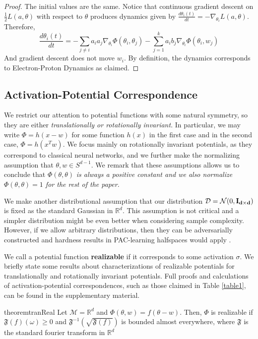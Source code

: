 \documentclass{article}
\newcommand{\R}{{\mathbb{R}}}
\begin{document}
\begin{proof}
The initial values are the same. Notice that continuous gradient descent on $\frac{1}{2}L(a,\theta)$ with respect to $\theta$ produces dynamics given by $\frac{d\theta_i(t)}{dt} = -\nabla_{\theta_i}L(a,\theta)$. Therefore,
\[\frac{d\theta_i(t)}{dt} = -\sum_{j \neq i} a_i a_j \nabla_{\theta_i}\Phi(\theta_i,\theta_j) - \sum_{j=1}^k a_ib_j\nabla_{\theta_i} \Phi(\theta_i,w_j)\]
And gradient descent does not move $w_i$. By definition, the dynamics corresponds to Electron-Proton Dynamics as claimed.
\end{proof}

\subsection{Activation-Potential Correspondence}


We restrict our attention to potential functions with some natural symmetry, so they are either {\it translationally or rotationally invariant}. In particular, we may write $\Phi= h(x-w)$ for some function $h(x)$  in the first case and in the second case, $\Phi = h(x^Tw)$. We focus mainly on rotationally invariant potentials, as they correspond to classical neural networks, and we further make the normalizing assumption that $\theta, w \in S^{d-1}$. We remark that these assumptions allows us to conclude that $\Phi(\theta,\theta)$ {\it is always a positive constant and we also normalize $\Phi(\theta,\theta) = 1$ for the rest of the paper.}

We make another distributional assumption that our distribution $\mathcal{D} = \mathcal{N}(0, {\bf I_{d\times d}})$ is fixed as the standard Gaussian in $\R^d$. This assumption is not critical and a simpler distribution might be even better when considering sample complexity. However, if we allow arbitrary distributions, then they can be adversarially constructed and hardness results in PAC-learning halfspaces would apply \cite{klivans2006cryptographic}. 

We call a potential function {\bf realizable} if it corresponds to some activation $\sigma$.  We briefly state some results about characterizations of realizable potentials for translationally and rotationally invariant potentials. Full proofs and calculations of activation-potential correspondences, such as those claimed in Table \ref{table1}, can be found in the supplementary material. 
\begin{restatable}{theorem}{tranReal}
\label{thm:tranReal}
Let $\mathcal{M} = \R^d$ and $\Phi(\theta,w) = f(\theta - w)$. Then, $\Phi$ is realizable if $\mathfrak{F}(f)(\omega) \geq 0$ and $\mathfrak{F}^{-1}(\sqrt{\mathfrak{F}(f)})$ is bounded almost everywhere, where $\mathfrak{F}$ is the standard fourier transform in $\R^d$
\end{restatable}
\end{document}
